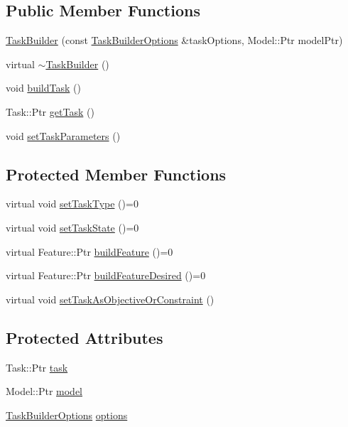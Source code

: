 \subsection*{Public Member Functions}
\begin{DoxyCompactItemize}
\item 
\hyperlink{classocra_1_1TaskBuilder_a47da2d3a4f793620895f5eda79ea80f6}{Task\+Builder} (const \hyperlink{classocra_1_1TaskBuilderOptions}{Task\+Builder\+Options} \&task\+Options, Model\+::\+Ptr model\+Ptr)
\item 
virtual \hyperlink{classocra_1_1TaskBuilder_ac4a6e94f7e39db652819ebbd99e2a334}{$\sim$\+Task\+Builder} ()
\item 
void \hyperlink{classocra_1_1TaskBuilder_a84109a9bca0da0b2f7220b183e7d032d}{build\+Task} ()
\item 
Task\+::\+Ptr \hyperlink{classocra_1_1TaskBuilder_a31a863f23c736bcfa9f1f4c5e24d4859}{get\+Task} ()
\item 
void \hyperlink{classocra_1_1TaskBuilder_a646ca4a01affbb2aa82cfdde32e8be66}{set\+Task\+Parameters} ()
\end{DoxyCompactItemize}
\subsection*{Protected Member Functions}
\begin{DoxyCompactItemize}
\item 
virtual void \hyperlink{classocra_1_1TaskBuilder_a1a979fc495be6dc30483aa8fd0ff2650}{set\+Task\+Type} ()=0
\item 
virtual void \hyperlink{classocra_1_1TaskBuilder_a7b44bfa101566ea4400e2d9bfdb9ff32}{set\+Task\+State} ()=0
\item 
virtual Feature\+::\+Ptr \hyperlink{classocra_1_1TaskBuilder_a58c0dc416a9607a344a080248ee26ac2}{build\+Feature} ()=0
\item 
virtual Feature\+::\+Ptr \hyperlink{classocra_1_1TaskBuilder_a7a2c8bcc5d95160d0e48806a2648f1a5}{build\+Feature\+Desired} ()=0
\item 
virtual void \hyperlink{classocra_1_1TaskBuilder_a9e7588983e3adf7f706d122a75e84d05}{set\+Task\+As\+Objective\+Or\+Constraint} ()
\end{DoxyCompactItemize}
\subsection*{Protected Attributes}
\begin{DoxyCompactItemize}
\item 
Task\+::\+Ptr \hyperlink{classocra_1_1TaskBuilder_ad3f099d23545d5d55d55ac2cf3d93b4d}{task}
\item 
Model\+::\+Ptr \hyperlink{classocra_1_1TaskBuilder_af612ab3b2881a7d472efabb650b23caf}{model}
\item 
\hyperlink{classocra_1_1TaskBuilderOptions}{Task\+Builder\+Options} \hyperlink{classocra_1_1TaskBuilder_a93ad03ab72579612f7ec5fe57b5df145}{options}
\end{DoxyCompactItemize}


